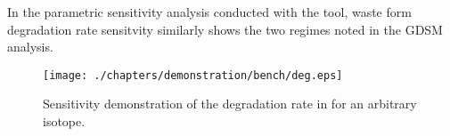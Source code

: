 
In the parametric sensitivity analysis conducted with the \Cyder tool, waste 
form degradation rate sensitvity similarly shows the two regimes noted in the 
\gls{GDSM} analysis.  


\begin{figure}[htbp!]
\begin{center}
\texttt{[image: ./chapters/demonstration/bench/deg.eps]}
\end{center}
\caption{Sensitivity demonstration of the degradation rate in \Cyder for an 
arbitrary isotope.}
\label{fig:deg}
\end{figure}
